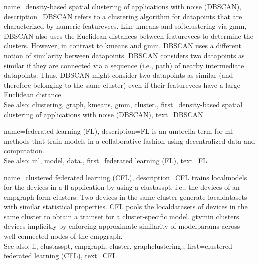{name={density-based spatial clustering of applications with noise (DBSCAN)}, 
	description={DBSCAN refers to a \gls{clustering} \gls{algorithm} for \glspl{datapoint} 
			that are characterized by numeric \glspl{featurevec}. 
		Like \gls{kmeans} and \gls{softclustering} via \gls{gmm}, DBSCAN also uses the Euclidean 
		distances between \glspl{featurevec} to determine the \glspl{cluster}. However, in contrast to \gls{kmeans} 
		and \gls{gmm}, DBSCAN uses a different notion of similarity between \glspl{datapoint}. 
		DBSCAN considers two \glspl{datapoint} as similar if they are connected 
		via a sequence (i.e., path) of nearby intermediate \glspl{datapoint}. 
		Thus, DBSCAN might consider two \glspl{datapoint} as similar (and therefore belonging 
		to the same \gls{cluster}) even if their \glspl{featurevec} have a large Euclidean distance.
				\\
		See also: \gls{clustering}, \gls{graph}, \gls{kmeans}, \gls{gmm}, \gls{cluster}.},
	first={density-based spatial clustering of applications with noise (DBSCAN)},
	text={DBSCAN} 
}

{name={federated learning (FL)}, 
	description={FL 
		is an umbrella term for \gls{ml} methods that train \glspl{model} in a collaborative 
		fashion using decentralized \gls{data} and computation.
				\\
		See also: \gls{ml}, \gls{model}, \gls{data}.},
	first={federated learning (FL)},
	text={FL} 
}
	
{name={clustered federated learning (CFL)}, 
 description={CFL trains \glspl{localmodel} for the 
 	\glspl{device} in a \gls{fl} application by using a \gls{clustasspt}, i.e., the \glspl{device} 
 	of an \gls{empgraph} form \glspl{cluster}. Two \glspl{device} in the same \gls{cluster} generate 
 	\glspl{localdataset} with similar statistical properties. CFL pools the \glspl{localdataset} of \glspl{device} 
 	in the same \gls{cluster} to obtain a \gls{trainset} for a \gls{cluster}-specific \gls{model}. 
 	\Gls{gtvmin} clusters \glspl{device} implicitly by enforcing approximate similarity of \gls{modelparams} 
 	across well-connected nodes of the \gls{empgraph}.\\ 
 	See also: \gls{fl}, \gls{clustasspt}, \gls{empgraph}, \gls{cluster}, \gls{graphclustering}.},
	first={clustered federated learning (CFL)},
	text={CFL} 
}

